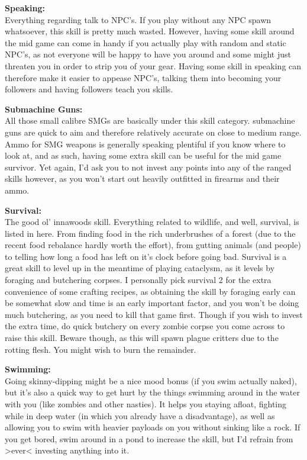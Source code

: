 \documentclass[11pt]{report}
\begin{document}
\textbf{Speaking:}\\Everything regarding talk to NPC's. If you play without any NPC spawn whatsoever, this skill is pretty much wasted. However, having some skill around the mid game can come in handy if you actually play with random and static NPC's, as not everyone will be happy to have you around and some might just threaten you in order to strip you of your gear. Having some skill in speaking can therefore make it easier to appease NPC's, talking them into becoming your followers and having followers teach you skills.

\textbf{Submachine Guns:}\\All those small calibre SMGs are basically under this skill category. submachine guns are quick to aim and therefore relatively accurate on close to medium range. Ammo for SMG weapons is generally speaking plentiful if you know where to look at, and as such, having some extra skill can be useful for the mid game survivor. Yet again, I'd ask you to not invest any points into any of the ranged skills however, as you won't start out heavily outfitted in firearms and their ammo.

\textbf{Survival:}\\The good ol' innawoods skill. Everything related to wildlife, and well, survival, is listed in here. From finding food in the rich underbrushes of a forest (due to the recent food rebalance hardly worth the effort), from gutting animals (and people) to telling how long a food has left on it's clock before going bad. Survival is a great skill to level up in the meantime of playing cataclysm, as it levels by foraging and butchering corpses. I personally pick survival 2 for the extra convenience of some crafting recipes, as obtaining the skill by foraging early can be somewhat slow and time is an early important factor, and you won't be doing much butchering, as you need to kill that game first. Though if you wish to invest the extra time, do quick butchery on every zombie corpse you come across to raise this skill. Beware though, as this will spawn plague critters due to the rotting flesh. You might wish to burn the remainder.

\textbf{Swimming:}\\Going skinny-dipping might be a nice mood bonus (if you swim actually naked), but it's also a quick way to get hurt by the things swimming around in the water with you (like zombies and other nasties). It helps you staying afloat, fighting while in deep water (in which you already have a disadvantage), as well as allowing you to swim with heavier payloads on you without sinking like a rock. If you get bored, swim around in a pond to increase the skill, but I'd refrain from >ever< investing anything into it.
\end{document}
